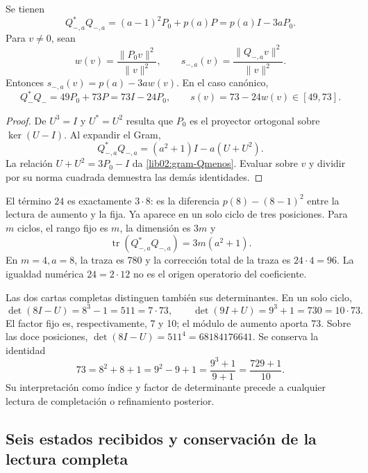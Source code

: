 \begin{theorem}
\label{lib02:gram-ternario}
Se tienen
\begin{equation}
 Q_{-,a}^*Q_{-,a}
 =(a-1)^2P_0+p(a)P=p(a)I-3aP_0.
 \label{lib02:gram-Qmenos}
\end{equation}
Para \(v\ne0\), sean
\[
 w(v)=\frac{\|P_0v\|^2}{\|v\|^2},\qquad
 s_{-,a}(v)=\frac{\|Q_{-,a}v\|^2}{\|v\|^2}.
\]
Entonces \(s_{-,a}(v)=p(a)-3aw(v)\). En el caso canónico,
\begin{equation}
 Q_-^*Q_-=49P_0+73P=73I-24P_0,
 \qquad s(v)=73-24w(v)\in[49,73].
 \label{lib02:73-24w}
\end{equation}
\end{theorem}
\begin{proof}
De \(U^3=I\) y \(U^*=U^2\) resulta que \(P_0\) es el
proyector ortogonal sobre \(\ker(U-I)\). Al expandir el Gram,
\[
 Q_{-,a}^*Q_{-,a}=(a^2+1)I-a(U+U^2).
\]
La relación \(U+U^2=3P_0-I\) da
\eqref{lib02:gram-Qmenos}. Evaluar sobre \(v\) y dividir por su
norma cuadrada demuestra las demás identidades.
\end{proof}

El término \(24\) es exactamente \(3\cdot8\): es la diferencia
\(p(8)-(8-1)^2\) entre la lectura de aumento y la fija. Ya aparece
en un solo ciclo de tres posiciones. Para \(m\) ciclos, el rango fijo
es \(m\), la dimensión es \(3m\) y
\[
 \operatorname{tr}(Q_{-,a}^*Q_{-,a})=3m(a^2+1).
\]
En \(m=4,a=8\), la traza es 780 y la corrección total de la traza
es \(24\cdot4=96\). La igualdad numérica \(24=2\cdot12\) no es
el origen operatorio del coeficiente.

Las dos cartas completas distinguen también sus determinantes. En un
solo ciclo,
\[
 \det(8I-U)=8^3-1=511=7\cdot73,
 \qquad
 \det(9I+U)=9^3+1=730=10\cdot73.
\]
El factor fijo es, respectivamente, 7 y 10; el módulo de aumento aporta
73. Sobre las doce posiciones,
\(\det(8I-U)=511^4=68184176641\). Se conserva la identidad
\begin{equation}
 73=8^2+8+1=9^2-9+1=\frac{9^3+1}{9+1}
 =\frac{729+1}{10}.
 \label{lib02:completacion73}
\end{equation}
Su interpretación como índice y factor de determinante precede a
cualquier lectura de completación o refinamiento posterior.

\subsection{Seis estados recibidos y conservación de la lectura completa}
\label{lib02:seis-estados}

